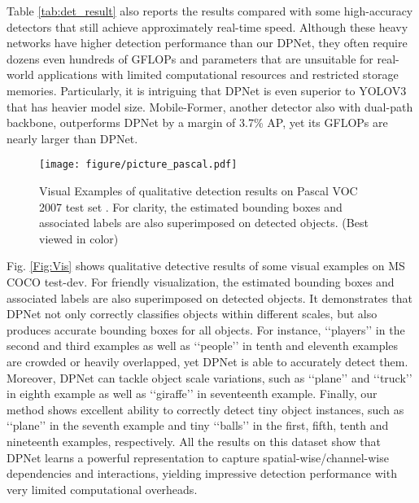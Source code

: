 \documentclass[lettersize,journal]{IEEEtran}
\begin{document}
Table \ref{tab:det_result} also reports the results compared with some high-accuracy detectors that still achieve approximately real-time speed. Although these heavy networks have higher detection performance than our DPNet, they often require dozens even hundreds of GFLOPs and parameters that are unsuitable for real-world applications with limited computational resources and restricted storage memories. Particularly, it is intriguing that DPNet is even superior to YOLOV3 \cite{redmon2018yolov3} that has heavier model size. Mobile-Former\cite{chen2021mobile}, another detector also with dual-path backbone, outperforms DPNet by a margin of 3.7\% AP, yet its GFLOPs are nearly  larger than DPNet.

\begin{figure*}[t!] 
	\centering 
	\texttt{[image: figure/picture\_pascal.pdf]} 
	\caption{Visual Examples of qualitative  detection results on Pascal VOC 2007 test set \cite{everingham2010pascal}. For clarity, the estimated bounding boxes and associated labels are also superimposed on detected objects. (Best viewed in color)} 
	\label{Fig:Vis_pascal} 
\end{figure*}


Fig. \ref{Fig:Vis} shows qualitative detective results of some visual examples on MS COCO test-dev. For friendly visualization, the estimated bounding boxes and associated labels are also superimposed on detected objects. It demonstrates that DPNet not only correctly classifies objects within different scales, but also produces accurate bounding boxes for all objects. For instance, ‘‘players’’ in the second and third examples as well as ‘‘people’’ in tenth and eleventh examples are crowded or heavily overlapped, yet DPNet is able to accurately detect them. Moreover, DPNet can tackle object scale variations, such as ‘‘plane’’ and ‘‘truck’’ in eighth example as well as ‘‘giraffe’’ in seventeenth example. Finally, our method shows excellent ability to correctly detect tiny object instances, such as ‘‘plane’’ in the seventh example and tiny ‘‘balls’’ in the first, fifth, tenth and nineteenth examples, respectively. All the results on this dataset show that DPNet learns a powerful representation to capture spatial-wise/channel-wise dependencies and interactions, yielding impressive detection performance with very limited computational overheads.
\end{document}
